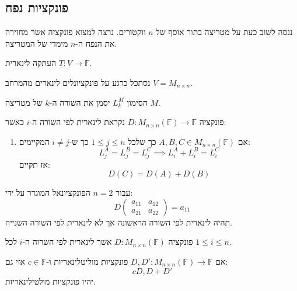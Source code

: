 \documentclass{tstextbook}
\begin{document}
\subsection{פונקציות נפח}

ננסה לשוב כעת על מטריצה בתור אוסף של \(n\) ווקטורים. נרצה למצוא פונקציה אשר מחזירה את הנפח ה-\(n\) מימדי של המטריצה.

\begin{definition}
העתקה לינארית \(T:V\to\mathbb{F}\).

\end{definition}
נסתכל כרגע על פונקציונלים לינארים מהמרחב \(V=M_{n\times n}\).

\begin{symbolize}
הסימון \(L_{k}^{M}\) יסמן את השורה ה-\(k\) של מטריצה \(M\).

\end{symbolize}
\begin{definition}
פונקציה \(D:M_{n\times n}\left( \mathbb{F}  \right)\to \mathbb{F}\) נקראת לינארית לפי השורה ה-\(i\) כאשר:

  \begin{enumerate}
    \item אם \(A,B,C \in M_{n\times n}\left( \mathbb{F}  \right)\) כך שלכל \(1\leq j\leq n\) כך ש-\(i\neq j\) המקיימים: 
$$L_{j}^{A}=L_{j}^{B}=L_{j}^{C}\implies L_{i}^{A}+L_{i}^{B}=L_{i}^{C}$$
אז תקיים:
$$D(C)=D(A)+D(B)$$
  \end{enumerate}
\end{definition}
\begin{example}
עבור \(n=2\) הפונקציונאל המוגדר על ידי:
$$D\begin{pmatrix}a_{11} & a_{12} \\a_{21} & a_{22}
\end{pmatrix}=a_{11}$$
תהיה לינארית לפי השורה הראשונה אך לא לינארית לפי השורה השנייה.

\end{example}
\begin{definition}[מולטילינאריות]
פונקציה \(D:M_{n\times n}\left( \mathbb{F}  \right)\) אשר לינארית לפי השרוה ה-\(i\) לכל \(1\leq i\leq n\).

\end{definition}
\begin{proposition}
אם \(D,D':M_{n\times n}\left( \mathbb{F}  \right)\to \mathbb{F}\) פונקציות מוליטלינאריות ו-\(c \in \mathbb{F}\) אזי גם:
$$c D, D+D'$$
יהיו פונקציות מולטילינאריות.

\end{proposition}
\end{document}
